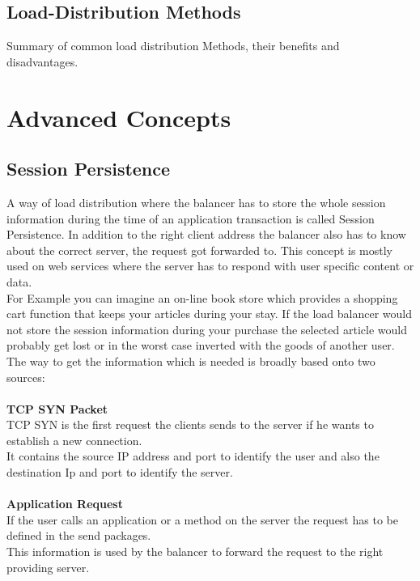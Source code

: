 \documentclass[12p]{article}
\begin{document}
	\subsection{Load-Distribution Methods}
	Summary of common load distribution Methods, their benefits and disadvantages.
	
	\newpage
	\section{Advanced Concepts}
	\subsection{Session Persistence}
	A way of load distribution where the balancer has to store the whole session information during the time of an application transaction is called Session Persistence. In addition to the right client address the balancer also has to know about the correct server, the request got forwarded to. This concept is mostly used on web services where the server has to respond with user specific content or data.\\
	For Example you can imagine an on-line book store which provides a shopping cart function that keeps your articles during your stay. If the load balancer would not store the session information during your purchase the selected article would probably get lost or in the worst case inverted with the goods of another user.\\
	The way to get the information which is needed is broadly based onto two sources:\\
	\\
	\textbf{TCP SYN Packet}\\
	TCP SYN is the first request the clients sends to the server if he wants to establish a new connection.\\
	It contains the source IP address and port to identify the user and also the destination Ip and port to identify the server.\\
	\\
	\textbf{Application Request}\\
	If the user calls an application or a method on the server the request has to be defined in the send packages.\\
	This information is used by the balancer to forward the request to the right providing server.
	
\end{document}
